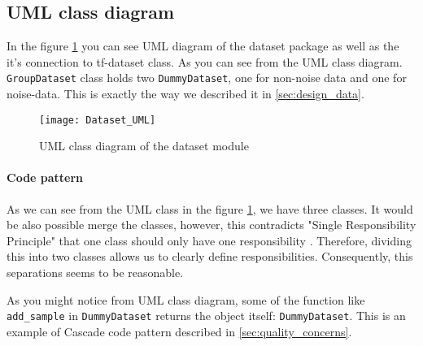 \subsection{UML class diagram}

In the figure \ref{fig:dataset_uml} you can see UML diagram of the dataset package
as well as the it's connection to tf-dataset class. As you can see from the UML
class diagram.
\lstinline{GroupDataset} class holds two \lstinline{DummyDataset}, one for
non-noise data and one for noise-data. This is exactly the way
we described it in \autoref{sec:design_data}.
\begin{figure}
	\texttt{[image: Dataset\_UML]}
	\caption{UML class diagram of the dataset module}
	\label{fig:dataset_uml}
\end{figure}

\paragraph{Code pattern} As we can see from the UML class in the figure
\ref{fig:dataset_uml}, we have three classes. It would be also possible
merge the classes, however, this contradicts "Single Responsibility Principle"
that one class should only have one responsibility \cite{martin2003agile}.
Therefore, dividing this into two classes allows us to clearly
define responsibilities. Consequently, this separations seems to be reasonable.

As you might notice from UML class diagram, some of the function like
\lstinline{add_sample} in \lstinline{DummyDataset} returns the object itself: \lstinline{DummyDataset}.
This is an example of Cascade code pattern described in \autoref{sec:quality_concerns}.

%

%
%
%
%
%

%

